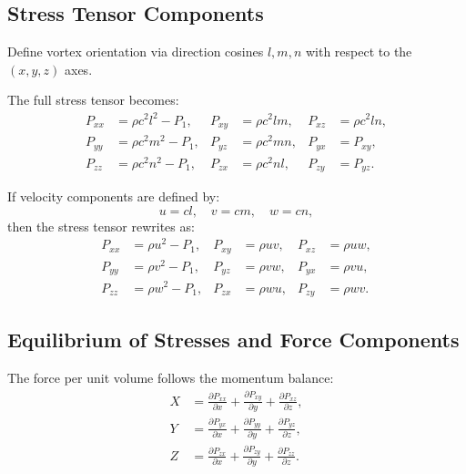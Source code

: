 \documentclass[12pt]{article}
\begin{document}
    \subsection{Stress Tensor Components}
    Define vortex orientation via direction cosines \(l, m, n\) with respect to the \((x, y, z)\) axes.

    The full stress tensor becomes:
    \begin{align}
        P_{xx} &= \rho c^2 l^2 - P_1, & P_{xy} &= \rho c^2 l m, & P_{xz} &= \rho c^2 l n, \\
        P_{yy} &= \rho c^2 m^2 - P_1, & P_{yz} &= \rho c^2 m n, & P_{yx} &= P_{xy}, \\
        P_{zz} &= \rho c^2 n^2 - P_1, & P_{zx} &= \rho c^2 n l, & P_{zy} &= P_{yz}.
    \end{align}

    If velocity components are defined by:
    \begin{equation}
        u = c l, \quad v = c m, \quad w = c n,
    \end{equation}
    then the stress tensor rewrites as:
    \begin{align}
        P_{xx} &= \rho u^2 - P_1, & P_{xy} &= \rho u v, & P_{xz} &= \rho u w, \\
        P_{yy} &= \rho v^2 - P_1, & P_{yz} &= \rho v w, & P_{yx} &= \rho v u, \\
        P_{zz} &= \rho w^2 - P_1, & P_{zx} &= \rho w u, & P_{zy} &= \rho w v.
    \end{align}

    \subsection{Equilibrium of Stresses and Force Components}
    The force per unit volume follows the momentum balance:
    \begin{align}
        X &= \frac{\partial P_{xx}}{\partial x} + \frac{\partial P_{xy}}{\partial y} + \frac{\partial P_{xz}}{\partial z}, \\
        Y &= \frac{\partial P_{yx}}{\partial x} + \frac{\partial P_{yy}}{\partial y} + \frac{\partial P_{yz}}{\partial z}, \\
        Z &= \frac{\partial P_{zx}}{\partial x} + \frac{\partial P_{zy}}{\partial y} + \frac{\partial P_{zz}}{\partial z}.
    \end{align}
\end{document}
